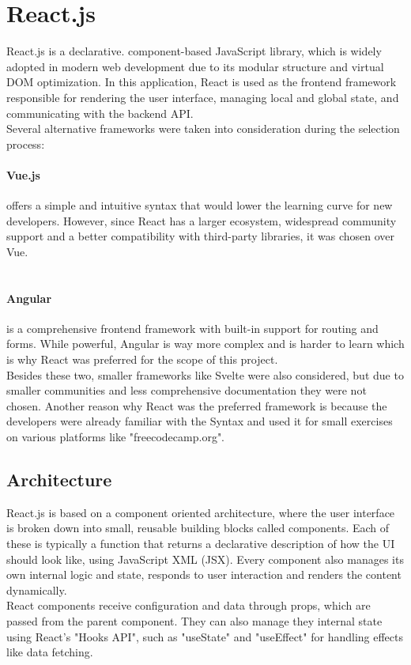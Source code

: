\documentclass[a4paper,12pt]{report}
\begin{document}
\section{React.js}
React.js is a declarative. component-based JavaScript library, which is widely adopted in modern web development due to its modular structure and virtual DOM optimization. In this application, React is used as the frontend framework responsible for rendering the user interface, managing local and global state, and communicating with the backend API. \cite{react-docs}\\
Several alternative frameworks were taken into consideration during the selection process:
\paragraph{Vue.js} offers a simple and intuitive syntax that would lower the learning curve for new developers. However, since React has a larger ecosystem, widespread community support and a better compatibility with third-party libraries, it was chosen over Vue. \cite{react-docs} \cite{vue-docs} \\ \\
\paragraph{Angular} is a comprehensive frontend framework with built-in support for routing and forms. While powerful, Angular is way more complex and is harder to learn which is why React was preferred for the scope of this project. \cite{angular-docs} \\
Besides these two, smaller frameworks like Svelte were also considered, but due to smaller communities and less comprehensive documentation they were not chosen. Another reason why React was the preferred framework is because the developers were already familiar with the Syntax and used it for small exercises on various platforms like "freecodecamp.org".
\subsection{Architecture}
React.js is based on a component oriented architecture, where the user interface is broken down into small, reusable building blocks called components. Each of these is typically a function that returns a declarative description of how the UI should look like, using JavaScript XML (JSX). Every component also manages its own internal logic and state, responds to user interaction and renders the content dynamically. \\
React components receive configuration and data through props, which are passed from the parent component. They can also manage they internal state using React's "Hooks API", such as "useState" and "useEffect" for handling effects like data fetching. \cite{react-docs} \cite{mdn-react}
\end{document}
